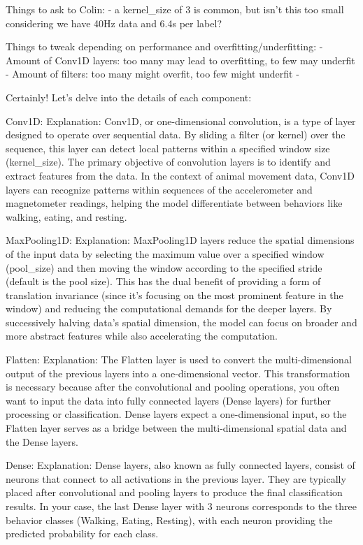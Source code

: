 Things to ask to Colin: 
- a kernel_size of 3 is common, but isn't this too small considering we have 40Hz data and 6.4s per label?
 


Things to tweak depending on performance and overfitting/underfitting: 
- Amount of Conv1D layers: too many may lead to overfitting, to few may underfit
- Amount of filters: too many might overfit, too few might underfit
- 



Certainly! Let's delve into the details of each component:

    Conv1D:
        Explanation: Conv1D, or one-dimensional convolution, is a type of layer designed to operate over sequential data. By sliding a filter (or kernel) over the sequence, this layer can detect local patterns within a specified window size (kernel_size). The primary objective of convolution layers is to identify and extract features from the data. In the context of animal movement data, Conv1D layers can recognize patterns within sequences of the accelerometer and magnetometer readings, helping the model differentiate between behaviors like walking, eating, and resting.

    MaxPooling1D:
        Explanation: MaxPooling1D layers reduce the spatial dimensions of the input data by selecting the maximum value over a specified window (pool_size) and then moving the window according to the specified stride (default is the pool size). This has the dual benefit of providing a form of translation invariance (since it's focusing on the most prominent feature in the window) and reducing the computational demands for the deeper layers. By successively halving data's spatial dimension, the model can focus on broader and more abstract features while also accelerating the computation.

    Flatten:
        Explanation: The Flatten layer is used to convert the multi-dimensional output of the previous layers into a one-dimensional vector. This transformation is necessary because after the convolutional and pooling operations, you often want to input the data into fully connected layers (Dense layers) for further processing or classification. Dense layers expect a one-dimensional input, so the Flatten layer serves as a bridge between the multi-dimensional spatial data and the Dense layers.

    Dense:
        Explanation: Dense layers, also known as fully connected layers, consist of neurons that connect to all activations in the previous layer. They are typically placed after convolutional and pooling layers to produce the final classification results. In your case, the last Dense layer with 3 neurons corresponds to the three behavior classes (Walking, Eating, Resting), with each neuron providing the predicted probability for each class.

